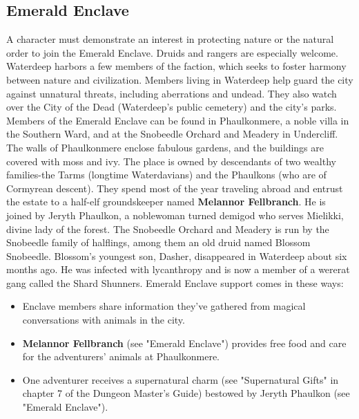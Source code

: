 \documentclass[10pt,a4paper,twoside,twocolumn,openany,nodeprecatedcode]{dndbook}
\begin{document}
\subsection{Emerald Enclave}
A character must demonstrate an interest in protecting nature or the natural order to join the Emerald Enclave. Druids and rangers are especially welcome.
Waterdeep harbors a few members of the faction, which seeks to foster harmony between nature and civilization. Members living in Waterdeep help guard the city against unnatural threats, including aberrations and undead. They also watch over the City of the Dead (Waterdeep's public cemetery) and the city's parks.
Members of the Emerald Enclave can be found in Phaulkonmere, a noble villa in the Southern Ward, and at the Snobeedle Orchard and Meadery in Undercliff. The walls of Phaulkonmere enclose fabulous gardens, and the buildings are covered with moss and ivy. The place is owned by descendants of two wealthy families-the Tarms (longtime Waterdavians) and the Phaulkons (who are of Cormyrean descent). They spend most of the year traveling abroad and entrust the estate to a half-elf groundskeeper named \textbf{Melannor Fellbranch}. He is joined by Jeryth Phaulkon, a noblewoman turned demigod who serves Mielikki, divine lady of the forest.
The Snobeedle Orchard and Meadery is run by the Snobeedle family of halflings, among them an old druid named Blossom Snobeedle. Blossom's youngest son, Dasher, disappeared in Waterdeep about six months ago. He was infected with lycanthropy and is now a member of a wererat gang called the Shard Shunners.
Emerald Enclave support comes in these ways:
\begin{itemize}

\item Enclave members share information they've gathered from magical conversations with animals in the city.
\item \textbf{Melannor Fellbranch} (see "Emerald Enclave") provides free food and care for the adventurers' animals at Phaulkonmere.
\item One adventurer receives a supernatural charm (see "Supernatural Gifts" in chapter 7 of the Dungeon Master's Guide) bestowed by Jeryth Phaulkon (see "Emerald Enclave").
\end{itemize}
\end{document}
